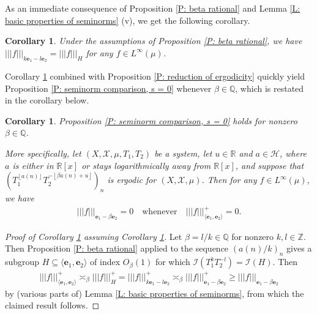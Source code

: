 \documentclass[11pt]{amsart}
\newtheorem{corollary}[lemma]{Corollary}
\theoremstyle{definition}
\newcommand{\Q}{{\mathbb Q}}
\newcommand{\R}{{\mathbb R}}
\newcommand{\Z}{{\mathbb Z}}
\newcommand{\CH}{{\mathcal H}}
\newcommand{\CI}{{\mathcal I}}
\newcommand{\CX}{{\mathcal X}}
\newcommand{\be}{{\mathbf{e}}}
\newcommand{\nnorm}[1]{\lvert\!|\!| #1|\!|\!\rvert}
\newcommand{\1}{{\mathbf{1}}}
\newcommand{\floor}[1]{{\left \lfloor #1 \right \rfloor}}
\begin{document}
As an immediate consequence of Proposition \ref{P: beta rational} and Lemma \ref{L: basic properties of seminorms} (v), we get the following corollary.
\begin{corollary}\label{C: seminorm comparison, beta rational}
    Under the assumptions of Proposition \ref{P: beta rational}, we have $\nnorm{f}_{k\be_1 - l\be_2} = \nnorm{f}_H$ for any $f\in L^\infty(\mu)$.
\end{corollary}
Corollary \ref{C: seminorm comparison, beta rational} combined with Proposition \ref{P: reduction of ergodicity} quickly yield Proposition \ref{P: seminorm comparison, s = 0} whenever $\beta\in\Q$, which is restated in the corollary below.
\begin{corollary}\label{C: seminorm comparison, beta rational 2}
    Proposition \ref{P: seminorm comparison, s = 0} holds for nonzero $\beta\in\Q$. 
    
    More specifically, let $(X, \CX, \mu, T_1, T_2)$ be a system, let $u\in\R$ and $a\in\CH$, where $a$ is either in $\R[x]$ or stays logarithmically away from $\R[x]$, and suppose that $(T_1^{\floor{a(n)}}T_2^{-\floor{\beta a(n)+u}})_n$ is ergodic for $(X, \CX, \mu)$. Then for any $f\in L^\infty(\mu)$, we have
    \begin{align*}
        \nnorm{f}_{\be_1 - \beta \be_2} = 0 \quad \textrm{whenever} \quad \nnorm{f}_{\langle\be_1, \be_2\rangle}^+ = 0.
    \end{align*}
\end{corollary}
\begin{proof}[Proof of Corollary \ref{C: seminorm comparison, beta rational 2} assuming Corollary \ref{C: seminorm comparison, beta rational}]
Let $\beta = l/k\in\Q$ for nonzero $k,l\in\Z$. Then Proposition \ref{P: beta rational} applied to the sequence $(a(n)/k)_n$ gives a subgroup $H\subseteq \langle \be_1, \be_2\rangle$ of index $O_{\beta}(1)$ for which $\CI(T_1^k T_2^{-l}) = \CI(H)$. Then
\begin{align*}
    \nnorm{f}_{\langle \be_1, \be_2\rangle}^+ \asymp_{\beta} \nnorm{f}_{H}^+ = \nnorm{f}_{k\be_1 - l\be_2}^+ \asymp_{\beta}\nnorm{f}_{\be_1 - \beta\be_2}^+\geq \nnorm{f}_{\be_1 - \beta\be_2}
\end{align*}
by (various parts of) Lemma \ref{L: basic properties of seminorms}, from which the claimed result follows.
\end{proof}
\end{document}

